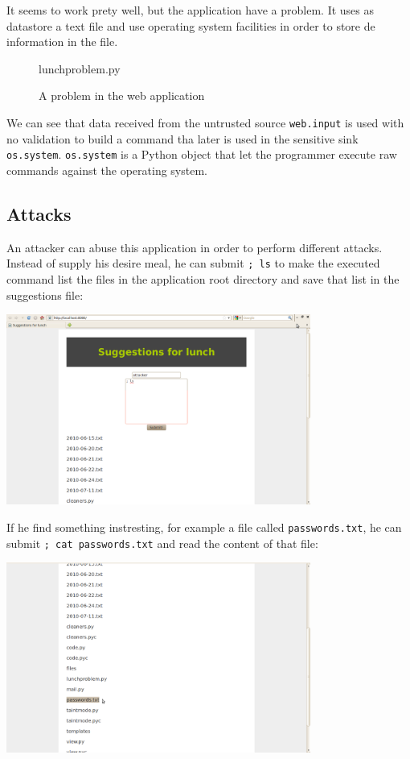 It seems to work prety well, but the application have a problem. It uses
as datastore a text file and use operating system facilities in order to
store de information in the file.

\begin{figure}[h]
{\small{

{lunchproblem.py}
\caption{\label{fig:example}A problem in the web application}
}}
\end{figure}


We can see that data received from the untrusted source
\texttt{web.input} is used
with no validation to build a command tha later is used
in the sensitive sink \texttt{os.system}. 
\texttt{os.system} is a Python object that let the 
programmer execute raw commands against the operating system.

\subsection*{Attacks} %
\label{Sec:Attacks}
An attacker can abuse this application in order to perform different attacks.
Instead of supply his desire meal, he can submit \texttt{; ls} to make the 
executed command list the files in the application root directory and save that
list in the suggestions file:

\includegraphics[width=100mm]{lunch3.png}

If he find something instresting, for example a file called 
\texttt{passwords.txt},
he can submit \texttt{; cat passwords.txt}
and read the content of that file:

\includegraphics[width=100mm]{lunch4.png}

